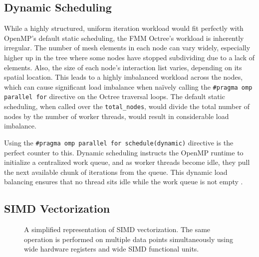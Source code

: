 \subsection{Dynamic Scheduling} \label{sec:dynamic-scheduling}
While a highly structured, uniform iteration workload would fit perfectly with OpenMP's default static scheduling, the \ac{FMM} Octree's workload is inherently irregular. The number of mesh elements in each node can vary widely, especially higher up in the tree where some nodes have stopped subdividing due to a lack of elements. Also, the size of each node's interaction list varies, depending on its spatial location. This leads to a highly imbalanced workload across the nodes, which can cause significant load imbalance when na\"ively calling the \texttt{\#pragma omp parallel for} directive on the Octree traversal loops. The default static scheduling, when called over the \texttt{total\_nodes}, would divide the total number of nodes by the number of worker threads, would result in considerable load imbalance.

Using the \texttt{\#pragma omp parallel for schedule(dynamic)} directive is the perfect counter to this. Dynamic scheduling instructs the OpenMP runtime to initialize a centralized work queue, and as worker threads become idle, they pull the next available chunk of iterations from the queue. This dynamic load balancing ensures that no thread sits idle while the work queue is not empty \cite{kylekloberdanzsblog}.
\subsection{SIMD Vectorization} \label{sec:simd-vectorization}

\begin{figure}[htpb]
    \centering
    
    \caption{A simplified representation of SIMD vectorization. The same operation is performed on multiple data points simultaneously using wide hardware registers and wide \ac{SIMD} functional units.}
    \label{fig:simd-vectorization}
    
\end{figure}

